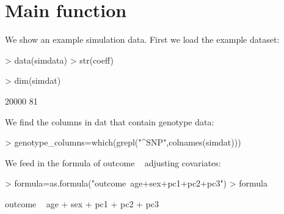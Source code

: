 \documentclass[12pt]{article}
\begin{document}
\section{Main function}

We show an example simulation data. 
First we load the example dataset:
\begin{Schunk}
\begin{Sinput}
> data(simdata)
> str(coeff)
\end{Sinput}
\begin{Sinput}
> dim(simdat)
\end{Sinput}
\begin{Soutput}
[1] 20000    81
\end{Soutput}
\end{Schunk}

We find the columns in dat that contain genotype data:
\begin{Schunk}
\begin{Sinput}
> genotype_columns=which(grepl("^SNP",colnames(simdat)))
\end{Sinput}
\end{Schunk}

We feed in the formula of outcome ~ adjusting covariates:
\begin{Schunk}
\begin{Sinput}
> formula=as.formula("outcome~age+sex+pc1+pc2+pc3")
> formula
\end{Sinput}
\begin{Soutput}
outcome ~ age + sex + pc1 + pc2 + pc3
\end{Soutput}
\end{Schunk}
\end{document}
